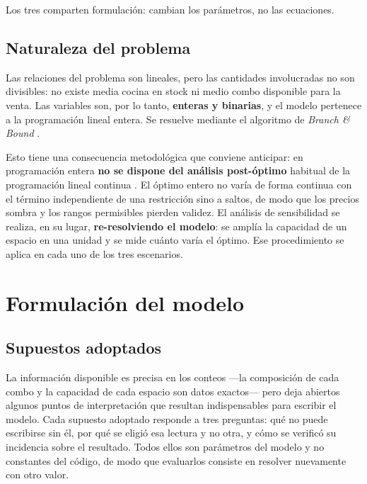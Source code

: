 \documentclass[10pt,a4paper]{article}
\begin{document}
Los tres comparten formulación: cambian los parámetros, no las ecuaciones.

\subsection{Naturaleza del problema}

Las relaciones del problema son lineales, pero las cantidades involucradas no
son divisibles: no existe media cocina en stock ni medio combo disponible para
la venta. Las variables son, por lo tanto, \textbf{enteras y binarias}, y el
modelo pertenece a la programación lineal entera. Se resuelve mediante el
algoritmo de \emph{Branch \& Bound} \cite{catedra-mip, hillier}.

Esto tiene una consecuencia metodológica que conviene anticipar: en programación
entera \textbf{no se dispone del análisis post-óptimo} habitual de la
programación lineal continua \cite{catedra-mip}. El óptimo entero no varía de
forma continua con el término independiente de una restricción sino a saltos, de
modo que los precios sombra y los rangos permisibles pierden validez. El
análisis de sensibilidad se realiza, en su lugar, \textbf{re-resolviendo el
modelo}: se amplía la capacidad de un espacio en una unidad y se mide cuánto
varía el óptimo. Ese procedimiento se aplica en cada uno de los tres escenarios.

\section{Formulación del modelo}
\label{sec:modelo}

\subsection{Supuestos adoptados}
\label{sec:supuestos}

La información disponible es precisa en los conteos —la composición de cada
combo y la capacidad de cada espacio son datos exactos— pero deja abiertos
algunos puntos de interpretación que resultan indispensables para escribir el
modelo. Cada supuesto adoptado responde a tres preguntas: qué no puede
escribirse sin él, por qué se eligió esa lectura y no otra, y cómo se verificó
su incidencia sobre el resultado. Todos ellos son parámetros del modelo y no
constantes del código, de modo que evaluarlos consiste en resolver nuevamente
con otro valor.
\end{document}

